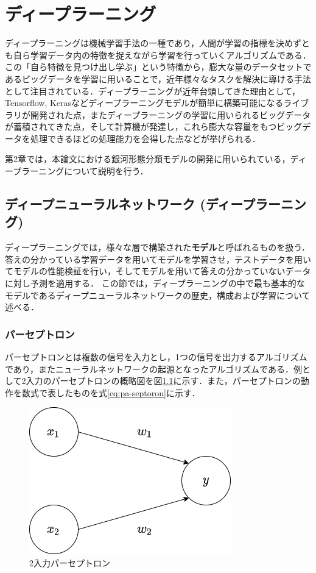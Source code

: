 \documentclass[a4j, 11pt]{jreport}
\begin{document}
\newpage
\chapter{ディープラーニング}
ディープラーニングは機械学習手法の一種であり，人間が学習の指標を決めずとも自ら学習データ内の特徴を捉えながら学習を行っていくアルゴリズムである．この「自ら特徴を見つけ出し学ぶ」という特徴から，膨大な量のデータセットであるビッグデータを学習に用いることで，近年様々なタスクを解決に導ける手法として注目されている．ディープラーニングが近年台頭してきた理由として，Tensorflow, Kerasなどディープラーニングモデルが簡単に構築可能になるライブラリが開発された点，またディープラーニングの学習に用いられるビッグデータが蓄積されてきた点，そして計算機が発達し，これら膨大な容量をもつビッグデータを処理できるほどの処理能力を会得した点などが挙げられる．

第2章では，本論文における銀河形態分類モデルの開発に用いられている，ディープラーニングについて説明を行う．
\section{ディープニューラルネットワーク (ディープラーニング)}
ディープラーニングでは，様々な層で構築された\textbf{モデル}と呼ばれるものを扱う．答えの分かっている学習データを用いてモデルを学習させ，テストデータを用いてモデルの性能検証を行い，そしてモデルを用いて答えの分かっていないデータに対し予測を適用する．
この節では，ディープラーニングの中で最も基本的なモデルであるディープニューラルネットワークの歴史，構成および学習について述べる．

\subsection{パーセプトロン}
パーセプトロンとは複数の信号を入力とし，1つの信号を出力するアルゴリズムであり，またニューラルネットワークの起源となったアルゴリズムである．例として2入力のパーセプトロンの概略図を図\ref{fig:pa-septoron}に示す．また，パーセプトロンの動作を数式で表したものを式\ref{eq:pa-septoron}に示す．

\begin{figure}[H]
  \centering
  \includegraphics[width=0.50\hsize, keepaspectratio]{images/drawio/pa-seputoron.png}
  \caption{2入力パーセプトロン}
  \label{fig:pa-septoron}
 \end{figure}
\end{document}
